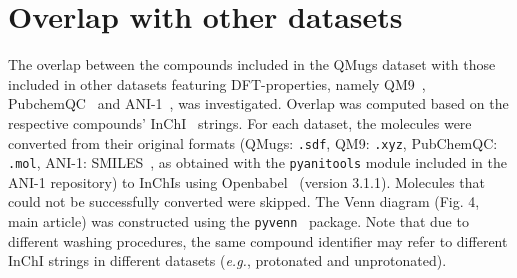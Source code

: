 \section{Overlap with other datasets}
The overlap between the compounds included in the QMugs dataset with those included in other datasets featuring DFT-properties, namely QM9~\cite{ramakrishnan2014quantum}, PubchemQC~\cite{nakata2017pubchemqc} and ANI-1~\cite{smith2017anid}, was investigated. Overlap was computed based on the respective compounds' InChI~\cite{heller2015inchi} strings. For each dataset, the molecules were converted from their original formats (QMugs: \texttt{.sdf}, QM9: \texttt{.xyz}, PubChemQC: \texttt{.mol}, ANI-1: SMILES~\cite{weininger1988smiles}, as obtained with the \texttt{pyanitools} module included in the ANI-1 repository) to InChIs using Openbabel~\cite{o2011open, openbabel} (version 3.1.1). Molecules that could not be successfully converted were skipped. The Venn diagram (Fig. 4, main article) was constructed using the \texttt{pyvenn}~\cite{pyvenn} package. Note that due to different washing procedures, the same compound identifier may refer to different InChI strings in different datasets (\textit{e.g.}, protonated and unprotonated).


